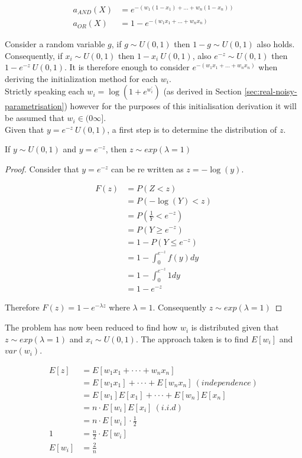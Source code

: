 \begin{align*}
a_{AND}(X) &= e^{-(w_1(1 - x_1) + ... + w_n(1 - x_n))}\\
a_{OR}(X) &= 1 - e^{-(w_1x_1 + ... + w_nx_n)}
\end{align*}

Consider a random variable $g$, if $g \sim U(0,1)$ then $1 - g \sim U(0,1)$ also holds. Consequently, if $x_i \sim U(0,1)$ then $1 - x_i ~ U(0,1)$, also $e^{-z} \sim U(0,1)$ then $1 - e^{-z} ~ U(0,1)$. It is therefore enough to consider $e^{-(w_1x_1 + ... + w_nx_n)}$ when deriving the initialization method for each $w_i$.\\

Strictly speaking each $w_i = \log(1 + e^{w^{'}_i})$ (as derived in Section \ref{sec:real-noisy-parametrisation}) however for the purposes of this initialisation derivation it will be assumed that $w_i \in (0 \infty]$.\\

Given that $y = e^{-z} ~ U(0,1)$, a first step is to determine the distribution of $z$.

\begin{theorem}
	If $y \sim U(0,1)$ and $y = e^{-z}$, then $z \sim exp(\lambda = 1)$
\end{theorem}
\begin{proof}
	Consider that $y = e^{-z}$ can be re written as $z = -\log(y)$.
	
	\begin{align*}
	F(z) &= P(Z < z)\\
	&= P(-\log(Y) < z)\\
	&= P(\frac{1}{Y} < e^{-z})\\
	&= P(Y \geq e^{-z})\\
	&= 1 - P(Y \leq e^{-z})\\
	&= 1 - \int_{0}^{e^{-z}} f(y) dy\\
	&= 1 - \int_{0}^{e^{-z}} 1 dy\\
	&= 1 - e^{-z}
	\end{align*}
	
	Therefore $F(z) = 1 - e^{-\lambda z}$ where $\lambda = 1$. Consequently $z \sim exp(\lambda = 1)$
\end{proof}

The problem has now been reduced to find how $w_i$ is distributed given that $z \sim exp(\lambda = 1)$ and $x_i \sim U(0,1)$. The approach taken is to find $E[w_i]$ and $var(w_i)$.

\begin{align*}
E[z] &= E[w_1x_1 + \cdot \cdot \cdot + w_nx_n]\\
&= E[w_1x_1] + \cdot \cdot \cdot + E[w_nx_n]\ (independence)\\
&= E[w_1]E[x_1] + \cdot \cdot \cdot + E[w_n]E[x_n]\\
&= n \cdot E[w_i]E[x_i]\ (i.i.d)\\
&= n \cdot E[w_i] \cdot \frac{1}{2}\\
1 &= \frac{n}{2} \cdot E[w_i]\\
E[w_i] &= \frac{2}{n}
\end{align*}

